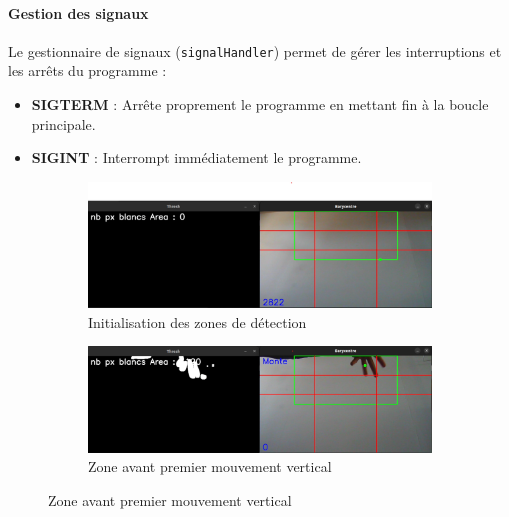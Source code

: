 \documentclass[a4paper, 11pt, french]{article}
\begin{document}
\paragraph{Gestion des signaux}
Le gestionnaire de signaux (\texttt{signalHandler}) permet de gérer les interruptions et les arrêts du programme :
\begin{itemize}
    \item \textbf{SIGTERM} : Arrête proprement le programme en mettant fin à la boucle principale.
    \item \textbf{SIGINT} : Interrompt immédiatement le programme.
\end{itemize}


\begin{figure}
    \centering
    \begin{subfigure}[b]{0.48\textwidth}
      \includegraphics[width=\textwidth]{detectionDeBase.png}
      \caption{Initialisation des zones de détection}
      \label{fig:detectionDeBase}
    \end{subfigure}
    \begin{subfigure}[b]{0.48\textwidth}
      \includegraphics[width=\textwidth]{detectionHautPremier.png}
      \caption{Zone avant premier mouvement vertical}
      \label{fig:detectionHautPremier}
    \end{subfigure}

    \vspace*{7mm}


\end{figure}
\end{document}

